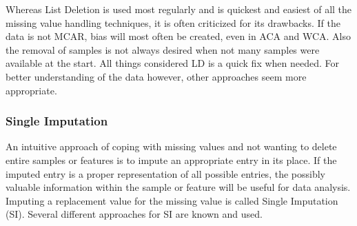 \documentclass[10pt,a4paper]{article}
\begin{document}
	Whereas List Deletion is used most regularly and is quickest and easiest of all the missing value handling techniques, it is often criticized for its drawbacks. If the data is not MCAR, bias will most often be created, even in ACA and WCA\cite{cartwright2003dealing}. Also the removal of samples is not always desired when not many samples were available at the start\cite{haukoos2007advanced, myrtveit2001analyzing, donders2006gentle}. All things considered LD is a quick fix when needed. For better understanding of the data however, other approaches seem more appropriate.
	
	\subsubsection{Single Imputation}
	\label{subsec:SingleImputation}
	
	An intuitive approach of coping with missing values and not wanting to delete entire samples or features is to impute an appropriate entry in its place. If the imputed entry is a proper representation of all possible entries, the possibly valuable information within the sample or feature will be useful for data analysis. Imputing a replacement value for the missing value is called Single Imputation (SI). Several different approaches for SI are known and used.\cite{haukoos2007advanced, donders2006gentle, myrtveit2001analyzing}
	
\end{document}
